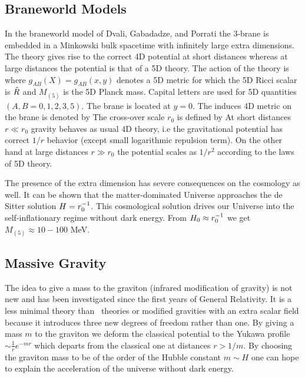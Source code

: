 \subsection{Braneworld Models}
In the braneworld model of Dvali, Gabadadze, and Porrati \parencite[DGP model][]{2000PhLB..485..208D} the 3-brane is embedded in a Minkowski bulk spacetime with infinitely large extra dimensions. The theory gives rise to the correct 4D potential at short distances whereas at large distances the potential is that of a 5D theory. The action of the theory is
where $g_{AB}(X)=g_{AB}(x,y)$ denotes a 5D metric for which the 5D Ricci scalar is ${\tilde{R}}$ and $M_{(5)}$ is the 5D Planck mass. Capital letters are used for 5D quantities $(A,B=0,1,2,3,5)$. The brane is located at $y=0$. The induces 4D metric on the brane is denoted by
The cross-over scale $r_0$ is defined by
At short distances $r\ll r_0$ gravity behaves as usual 4D theory, i.e the gravitational potential has correct $1/r$ behavior (except small logarithmic repulsion term). On the other hand at large distances $r\gg r_0$ the potential scales as $1/r^2$ according to the laws of 5D theory.

The presence of the extra dimension has severe consequences on the cosmology as well. It can be shown \parencite{2010deto.book.....A,2009PhLB..674..237M} that the matter-dominated Universe approaches the de Sitter solution $H=r_0^{-1}$. This cosmological solution drives our Universe into the self-inflationary regime without dark energy. From $H_0\approx r_0^{-1}$ we get $M_{(5)}\approx10-100$ MeV.
\subsection{Massive Gravity}
The idea to give a mass to the graviton (infrared modification of gravity) is not new and has been investigated since the first years of General Relativity. It is a less minimal theory than \fR\ theories or modified gravities with an extra scalar field because it introduces three new degrees of freedom rather than one. By giving a mass $m$ to the graviton we deform the classical potential to the Yukawa profile $\sim\frac1r e^{-mr}$ which departs from the classical one at distances $r>1/m$. By choosing the graviton mass to be of the order of the Hubble constant $m\sim H$ one can hope to explain the acceleration of the universe without dark energy.

